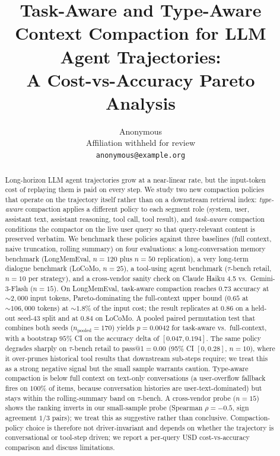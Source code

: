 \documentclass{article}
\title{Task-Aware and Type-Aware Context Compaction for {LLM} Agent Trajectories: \\
A Cost-vs-Accuracy Pareto Analysis}
\author{%
  Anonymous \\
  Affiliation withheld for review \\
  \texttt{anonymous@example.org}
}
\begin{document}
\maketitle

\begin{abstract}
Long-horizon LLM agent trajectories grow at a near-linear rate, but the
input-token cost of replaying them is paid on every step. We study two
new compaction policies that operate on the trajectory itself rather than
on a downstream retrieval index: \emph{type-aware} compaction applies a
different policy to each segment role (system, user, assistant text,
assistant reasoning, tool call, tool result), and \emph{task-aware}
compaction conditions the compactor on the live user query so that
query-relevant content is preserved verbatim. We benchmark these
policies against three baselines (full context, naive truncation,
rolling summary) on four evaluations: a long-conversation memory
benchmark (LongMemEval, $n{=}120$ plus $n{=}50$ replication), a very
long-term dialogue benchmark (LoCoMo, $n{=}25$), a tool-using agent
benchmark ($\tau$-bench retail, $n{=}10$ per strategy), and a cross-vendor
sanity check on Claude Haiku 4.5 vs.\ Gemini-3-Flash ($n{=}15$). On
LongMemEval, task-aware compaction reaches $0.73$ accuracy at
$\sim\!2{,}000$ input tokens, Pareto-dominating the
full-context upper bound ($0.65$ at $\sim\!106{,}000$ tokens) at $\sim\!1.8\%$
of the input cost; the result replicates at $0.86$ on a held-out
seed-43 split and at $0.84$ on LoCoMo. A pooled paired permutation
test that combines both seeds ($n_{\text{pooled}}{=}170$) yields
$p{=}0.0042$ for task-aware vs.\ full-context, with a bootstrap
$95\%$ CI on the accuracy delta of $[0.047, 0.194]$. The same policy
degrades sharply on $\tau$-bench retail to pass@1${=}0.00$
(95\% CI $[0, 0.28]$, $n{=}10$), where it over-prunes historical
tool results that downstream sub-steps require; we treat this as a
strong negative signal but the small sample warrants caution.
Type-aware compaction is below full context on text-only conversations
(a user-overflow fallback fires on $100\%$ of items, because
conversation histories are user-text-dominated) but stays within the
rolling-summary band on $\tau$-bench. A cross-vendor probe ($n{=}15$)
shows the ranking inverts in our small-sample probe (Spearman
$\rho{=}{-}0.5$, sign agreement $1/3$ pairs); we treat this as
suggestive rather than conclusive. Compaction-policy
choice is therefore not driver-invariant and depends on whether the
trajectory is conversational or tool-step driven; we report a per-query
USD cost-vs-accuracy comparison and discuss limitations.
\end{abstract}
\end{document}
